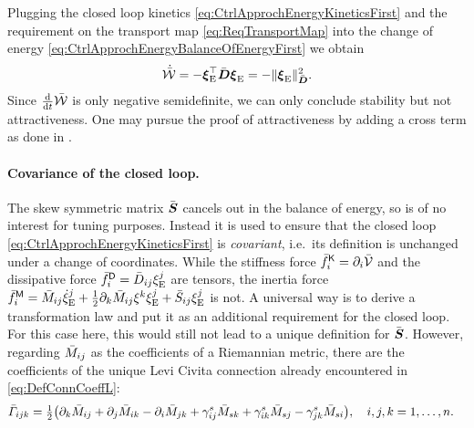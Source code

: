Plugging the closed loop kinetics \eqref{eq:CtrlApprochEnergyKineticsFirst} and the requirement on the transport map \eqref{eq:ReqTransportMap} into the change of energy \eqref{eq:CtrlApprochEnergyBalanceOfEnergyFirst} we obtain
\begin{align}
 \totalEnergyCd = -\sysVelE^\top \sysDissMatC \sysVelE = -\norm[\sysDissMatC]{\sysVelE}^2.
\end{align}
Since $\tdiff{t} \totalEnergyC$ is only negative semidefinite, we can only conclude stability but not attractiveness.
One may pursue the proof of attractiveness by adding a cross term as done in \cite[sec.\ 4.2]{Bullo:TrackingAutomatica}.

\paragraph{Covariance of the closed loop.}
The skew symmetric matrix $\accCtrl{\mat{S}}$ cancels out in the balance of energy, so is of no interest for tuning purposes.
Instead it is used to ensure that the closed loop \eqref{eq:CtrlApprochEnergyKineticsFirst} is \textit{covariant}, i.e.\ its definition is unchanged under a change of coordinates.
While the stiffness force $\genForceStiffCoeffC{\LidxI} = \dirDiff{\LidxI} \potentialEnergyC$ and the dissipative force $\genForceDissCoeffC{\LidxI} = \sysDissMatCoeffC{\LidxI\LidxII} \sysVelCoeffE{\LidxII}$ are tensors, the inertia force $\genForceInertiaCoeffC{\LidxI} = \sysInertiaMatCoeffC{\LidxI\LidxII} \sysVelCoeffEd{\LidxII} + \tfrac{1}{2} \dirDiff{\LidxIII} \sysInertiaMatCoeffC{\LidxI\LidxII} \sysVelCoeff{\LidxIII} \sysVelCoeffE{\LidxII} + \accCtrl{S}_{\LidxI\LidxII} \sysVelCoeffE{\LidxII}$ is not.
A universal way is to derive a transformation law and put it as an additional requirement for the closed loop.
For this case here, this would still not lead to a unique definition for $\accCtrl{\mat{S}}$.
However, regarding $\sysInertiaMatCoeffC{\LidxI\LidxII}$ as the coefficients of a Riemannian metric, there are the coefficients of the unique Levi Civita connection already encountered in \eqref{eq:DefConnCoeffL}:
\begin{align}
 \ConnCoeffLC{\LidxI}{\LidxII}{\LidxIII} &= \tfrac{1}{2}\big( \partial_\LidxIII \sysInertiaMatCoeffC{\LidxI\LidxII} + \partial_\LidxII \sysInertiaMatCoeffC{\LidxI\LidxIII} - \partial_\LidxI \sysInertiaMatCoeffC{\LidxII\LidxIII} + \BoltzSym{\LidxV}{\LidxI}{\LidxII} \sysInertiaMatCoeffC{\LidxV\LidxIII} + \BoltzSym{\LidxV}{\LidxI}{\LidxIII} \sysInertiaMatCoeffC{\LidxV\LidxII} - \BoltzSym{\LidxV}{\LidxII}{\LidxIII} \sysInertiaMatCoeffC{\LidxV\LidxI} \big),
\quad
 \LidxI, \LidxII, \LidxIII = 1,\ldots,\dimConfigSpace
 .
\end{align}
